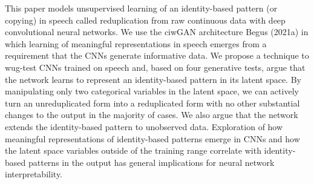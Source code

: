 This paper models unsupervised learning of an identity-based pattern (or copying) in speech called reduplication from raw continuous data with deep convolutional neural networks. We use the ciwGAN architecture Begus (2021a) in which learning of meaningful representations in speech emerges from a requirement that the CNNs generate informative data. We propose a technique to wug-test CNNs trained on speech and, based on four generative tests, argue that the network learns to represent an identity-based pattern in its latent space. By manipulating only two categorical variables in the latent space, we can actively turn an unreduplicated form into a reduplicated form with no other substantial changes to the output in the majority of cases. We also argue that the network extends the identity-based pattern to unobserved data. Exploration of how meaningful representations of identity-based patterns emerge in CNNs and how the latent space variables outside of the training range correlate with identity-based patterns in the output has general implications for neural network interpretability.